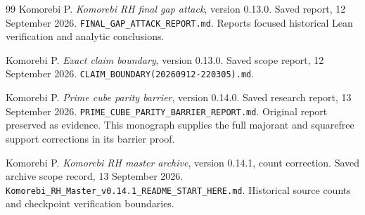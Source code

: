 \begin{thebibliography}{99}
Komorebi P.
\emph{Komorebi RH final gap attack}, version 0.13.0.
Saved report, 12 September 2026.
\texttt{FINAL\_GAP\_ATTACK\_REPORT.md}.
Reports focused historical Lean verification and analytic conclusions.

Komorebi P.
\emph{Exact claim boundary}, version 0.13.0.
Saved scope report, 12 September 2026.
\texttt{CLAIM\_BOUNDARY(20260912-220305).md}.

Komorebi P.
\emph{Prime cube parity barrier}, version 0.14.0.
Saved research report, 13 September 2026.
\texttt{PRIME\_CUBE\_PARITY\_BARRIER\_REPORT.md}.
Original report preserved as evidence. This monograph supplies
the full majorant and squarefree support corrections in its barrier proof.

Komorebi P.
\emph{Komorebi RH master archive}, version 0.14.1, count correction.
Saved archive scope record, 13 September 2026.
\texttt{Komorebi\_RH\_Master\_v0.14.1\_README\_START\_HERE.md}.
Historical source counts and checkpoint verification boundaries.

\end{thebibliography}
